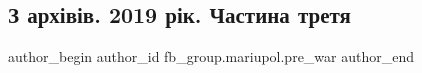  
 
 
 
 

\subsection{З архівів. 2019 рік. Частина третя}
\label{sec:08_02_2023.fb.fb_group.mariupol.pre_war.1.z_arkh_v_v__2019_r_k}

\ifcmt
 author_begin
   author_id fb_group.mariupol.pre_war
 author_end
\fi
